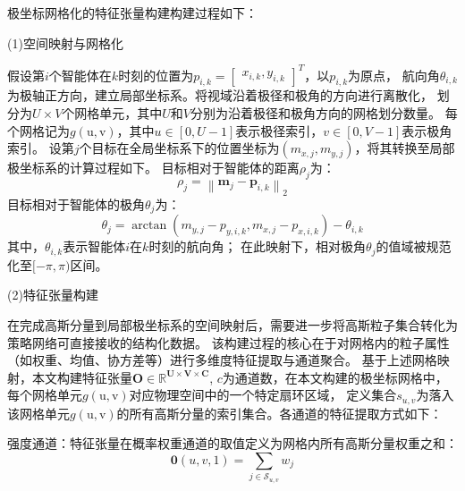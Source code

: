 极坐标网格化的特征张量构建构建过程如下：

(1)空间映射与网格化

假设第$i$个智能体在$k$时刻的位置为${p}_{i,k}=\begin{bmatrix}x_{i,k},y_{i,k}\end{bmatrix}^{T}$，以${p}_{i,k}$为原点，
航向角$\theta_{i,k}$为极轴正方向，建立局部坐标系。将视域沿着极径和极角的方向进行离散化，
划分为$U\times{V}$个网格单元，其中$U$和$V$分别为沿着极径和极角方向的网格划分数量。
每个网格记为$g(\mathrm{u,v})$，其中$u\in[0,U-1]$表示极径索引，$v\in[0,V-1]$表示极角索引。
设第$j$个目标在全局坐标系下的位置坐标为$(m_{x,j},m_{y,j})$，将其转换至局部极坐标系的计算过程如下。
目标相对于智能体的距离$\rho_j$为：
\begin{equation}
\rho_j=\left\| \mathbf{m}_j - \mathbf{p}_{i,k} \right\|_2
\end{equation}
目标相对于智能体的极角$\theta_j$为：
\begin{equation}
\theta_j=\arctan\left(m_{y,j}-p_{y,i,k},m_{x,j}-p_{x,i,k}\right)-\theta_{i,k}
\end{equation}
其中，$\theta_{i,k}$表示智能体$i$在$k$时刻的航向角；
在此映射下，相对极角$\theta_j$的值域被规范化至$[-\pi,\pi)$区间。

(2)特征张量构建

在完成高斯分量到局部极坐标系的空间映射后，需要进一步将高斯粒子集合转化为策略网络可直接接收的结构化数据。
该构建过程的核心在于对网格内的粒子属性（如权重、均值、协方差等）进行多维度特征提取与通道聚合。
基于上述网格映射，本文构建特征张量$\mathbf{O}\in\mathbb{R}^{\mathbf{U}\times\mathbf{V}\times\mathbf{C}}$,
$c$为通道数，在本文构建的极坐标网格中，每个网格单元$g(\mathrm{u,v})$对应物理空间中的一个特定扇环区域，
定义集合$s_{u,v}$为落入该网格单元$g(\mathrm{u,v})$的所有高斯分量的索引集合。各通道的特征提取方式如下：

强度通道：特征张量在概率权重通道的取值定义为网格内所有高斯分量权重之和：
\begin{equation}
\mathbf{0}(u,v,1)=\sum_{j\in\mathcal{S}_{u,v}}w_{j}
\end{equation}

